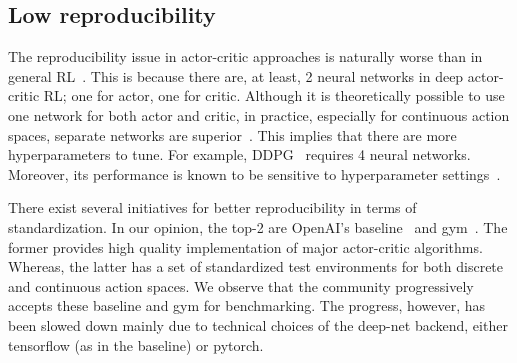 \subsection{Low reproducibility}
The reproducibility issue in actor-critic approaches is naturally worse than in general RL~\cite{henderson2017reinforcement}.
This is because there are, at least, 2 neural networks in deep actor-critic RL;
one for actor, one for critic.
Although it is theoretically possible to use one network for both actor and critic,
in practice, especially for continuous action spaces, separate networks are superior~\cite{pmlr-v48-mniha16}.
This implies that there are more hyperparameters to tune.
For example, DDPG~\cite{LillicrapHPHETS15} requires 4 neural networks.
Moreover, its performance is known to be sensitive to hyperparameter settings~\cite{Duan:2016}.

There exist several initiatives for better reproducibility in terms of standardization.
In our opinion, the top-2 are OpenAI's baseline~\cite{baselines} and gym~\cite{1606.01540}.
The former provides high quality implementation of major actor-critic algorithms.
Whereas, the latter has a set of standardized test environments for both discrete and continuous action spaces.
We observe that the community progressively accepts these baseline and gym for benchmarking.
The progress, however, has been slowed down mainly due to technical choices of the deep-net backend,
either tensorflow (as in the baseline) or pytorch.
